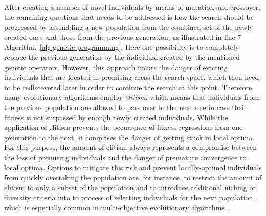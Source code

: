 After creating a number of novel individuals by means of mutation and crossover, the remaining questions that needs to be addressed is how the search should be progressed by assembling a new population from the combined set of the newly created ones and those from the previous generation, as illustrated in line 7 Algorithm~\ref{alg:genetic-programming}.
Here one possibility is to completely replace the previous generation by the individual created by the mentioned genetic operators.
However, this approach incurs the danger of evicting individuals that are located in promising areas the search space, which then need to be rediscovered later in order to continue the search at this point.
Therefore, many evolutionary algorithms employ \emph{elitism}, which means that individuals from the previous population are allowed to pass over to the next one in case their fitness is not surpassed by enough newly created individuals.
While the application of elitism prevents the occurrence of fitness regressions from one generation to the next, it comprises the danger of getting stuck in local optima.
For this purpose, the amount of elitism always represents a compromise between the loss of promising individuals and the danger of premature convergence to local optima.
Options to mitigate this risk and prevent locally-optimal individuals from quickly overtaking the population are, for instance, to restrict the amount of elitism to only a subset of the population and to introduce additional niching or diversity criteria into to process of selecting individuals for the next population, which is especially common in multi-objective evolutionary algorithms~\cite{coello2007evolutionary}.